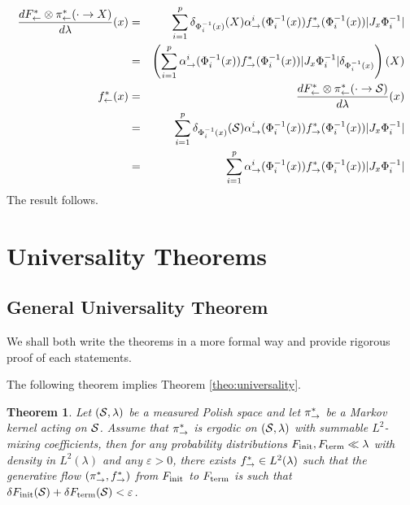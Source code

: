 \documentclass{article}
\theoremstyle{plain}
\newtheorem{theorem}{Theorem}[section]
\theoremstyle{definition}
\theoremstyle{remark}
\theoremstyle{fact}
\begin{document}
\begin{eqnarray}
    \frac{dF^*_{\leftarrow} \otimes \pi_{\leftarrow}^*(\cdot \rightarrow X)}{d\lambda}(x) &=& \sum_{i=1}^p  \delta_{\Phi_i^{-1}(x)}(X)  \alpha_{\rightarrow}^i(\Phi_i^{-1}(x)) f^*_{\rightarrow}(\Phi_i^{-1}(x)) |J_{x} \Phi_i^{-1}|\\
    &=& \left(\sum_{i=1}^p   \alpha_{\rightarrow}^i(\Phi_i^{-1}(x)) f^*_{\rightarrow}(\Phi_i^{-1}(x)) |J_{x} \Phi_i^{-1}| \delta_{\Phi_i^{-1}(x)} \right) (X)\\
    f^*_{\leftarrow}(x) &=&  \frac{dF^*_{\leftarrow} \otimes \pi_{\leftarrow}^*(\cdot \rightarrow \mathcal S)}{d\lambda}(x) \\&=&   \sum_{i=1}^p  \delta_{\Phi_i^{-1}(x)}(\mathcal S)  \alpha_{\rightarrow}^i(\Phi_i^{-1}(x)) f^*_{\rightarrow}(\Phi_i^{-1}(x)) |J_{x} \Phi_i^{-1}|\\
    &=&\sum_{i=1}^p   \alpha_{\rightarrow}^i(\Phi_i^{-1}(x)) f^*_{\rightarrow}(\Phi_i^{-1}(x)) |J_{x} \Phi_i^{-1}|
\end{eqnarray}
The result follows.



\section{Universality Theorems}
\subsection{General Universality Theorem}
We shall both write the theorems in a more formal way and provide rigorous proof of each statements. 

The following theorem implies Theorem \ref{theo:universality}.
\begin{theorem} \label{theo:universality_true}Let $(\mathcal S,\lambda)$ be a measured Polish space and let $\pi_{\rightarrow}^*$ be a Markov kernel acting on $\mathcal S$. Assume that $\pi_{\rightarrow}^*$ is ergodic on $(\mathcal S,\lambda)$ with summable $L^2$-mixing coefficients, then for any probability distributions $F_{\mathrm{init}},F_{\mathrm{term}} \ll \lambda$ with density in $L^2(\lambda)$ and any $\varepsilon>0$, there exists $f^*_{\rightarrow}\in L^2(\lambda)$ such that the generative flow $(\pi_{\rightarrow}^*,f^*_{\rightarrow})$ from $F_{\mathrm{init}}$ to $F_{\mathrm{term}}$ is such that $\delta F_{\mathrm{init}}(\mathcal S)+\delta F_{\mathrm{term}}(\mathcal S)<\varepsilon$.
\end{theorem}
\end{document}

